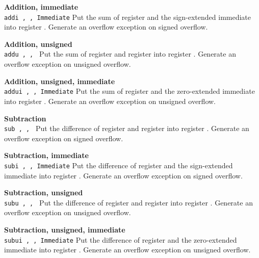 \noindent
{\bf Addition, immediate}\\
\noindent
\texttt{addi \regd, \regs, Immediate}
Put the sum of register \regs{} and the sign-extended immediate
into register \regd{}. Generate an overflow exception on signed overflow.
\vspace{3ex}
\newpage

\noindent
{\bf Addition, unsigned}\\
\noindent
\texttt{addu \regd, \regs, \regt}
Put the sum of register \regs{} and register \regt{}
into register \regd{}. Generate an overflow exception on unsigned overflow.
\vspace{3ex}

\noindent
{\bf Addition, unsigned, immediate}\\
\noindent
\texttt{addui \regd, \regs, Immediate}
Put the sum of register \regs{} and the zero-extended immediate
into register \regd{}. Generate an overflow exception on unsigned overflow.
\vspace{3ex}

\noindent
{\bf Subtraction}\\
\noindent
\texttt{sub \regd, \regs, \regt}
Put the difference of register \regs{} and register \regt{}
into register \regd{}. Generate an overflow exception on signed overflow.
\vspace{3ex}

\noindent
{\bf Subtraction, immediate}\\
\noindent
\texttt{subi \regd, \regs, Immediate}
Put the difference of register \regs{} and the sign-extended immediate
into register \regd{}. Generate an overflow exception on signed overflow.
\vspace{3ex}

\noindent
{\bf Subtraction, unsigned}\\
\noindent
\texttt{subu \regd, \regs, \regt}
Put the difference of register \regs{} and register \regt{}
into register \regd{}. Generate an overflow exception on unsigned overflow.
\vspace{3ex}
\newpage

\noindent
{\bf Subtraction, unsigned, immediate}\\
\noindent
\texttt{subui \regd, \regs, Immediate}
Put the difference of register \regs{} and the zero-extended immediate
into register \regd{}. Generate an overflow exception on unsigned overflow.
\vspace{3ex}

